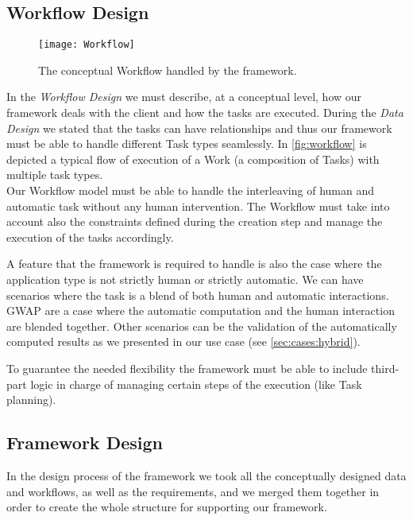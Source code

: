 \subsection{Workflow Design}\label{design:work}
\begin{figure}[htb]
    \centering
    \texttt{[image: Workflow]}
    \caption{The conceptual Workflow handled by the framework.}
    \label{fig:workflow}
\end{figure}
In the \emph{Workflow Design} we must describe, at a conceptual level, how our
framework deals with the client and how the tasks are executed. During the
\emph{Data Design} we stated that the tasks can have relationships and thus our
framework must be able to handle different Task types seamlessly. In
\autoref{fig:workflow} is depicted a typical flow of execution of a Work (a
composition of Tasks) with multiple task types.\\

Our Workflow model must be able to handle the interleaving of human and automatic
task without any human intervention. The Workflow must take into account also the
constraints defined during the creation step and manage the execution of the
tasks accordingly.

A feature that the framework is required to handle is also the case where
the application type is not strictly human or strictly automatic. We can have
scenarios where the task is a blend of both human and automatic interactions.
\ac{GWAP} are a case where the automatic computation and the human interaction
are blended together. Other scenarios can be the validation of the automatically
computed results as we presented in our use case (see \ref{sec:cases:hybrid}).

To guarantee the needed flexibility the framework must be able to include third-part
logic in charge of managing certain steps of the execution (like Task planning).




\subsection{Framework Design}
In the design process of the framework we took all the conceptually designed data
and workflows, as well as the requirements, and we merged them together in order
to create the whole structure for supporting our framework.\\

